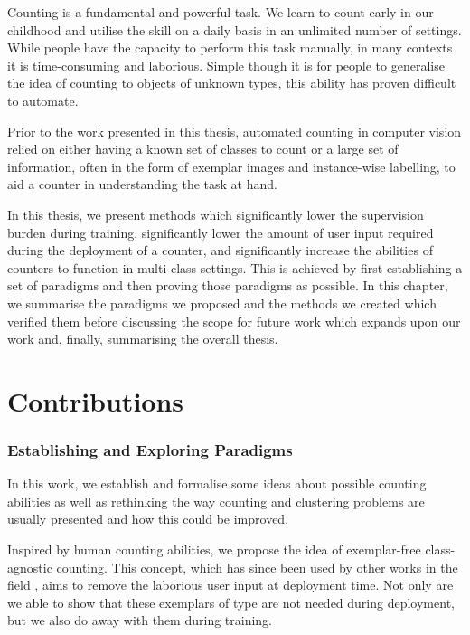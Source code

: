 \documentclass[../thesis.tex]{subfiles}
\begin{document}
Counting is a fundamental and powerful task.
We learn to count early in our childhood and utilise the skill on a daily basis in an unlimited number of settings. 
While people have the capacity to perform this task manually, in many contexts it is time-consuming and laborious.
Simple though it is for people to generalise the idea of counting to objects of unknown types, this ability has proven difficult to automate.

Prior to the work presented in this thesis, automated counting in computer vision relied on either having a known set of classes to count or a large set of information, often in the form of exemplar images and instance-wise labelling, to aid a counter in understanding the task at hand.  

In this thesis, we present methods which significantly lower the  supervision burden during training, significantly lower the amount of user input required during the deployment of a counter, and significantly increase the abilities of counters to function in multi-class settings.
This is achieved by first establishing a set of paradigms and then proving those paradigms as possible.
In this chapter, we summarise the paradigms we proposed and the methods we created which verified them before discussing the scope for future work which expands upon our work and, finally, summarising the overall thesis.




\section{Contributions}\label{conclusion:contributions}

\subsubsection{Establishing and Exploring Paradigms}
In this work, we establish and formalise some ideas about possible counting abilities as well as rethinking the way counting and clustering problems are usually presented and how this could be improved.


Inspired by human counting abilities, we propose the idea of exemplar-free class-agnostic counting. This concept, which has since been used by other works in the field \cite{ranjan2022exemplar, liu2022countr, xu2023zsc}, aims to remove the laborious user input at deployment time. Not only are we able to show that these exemplars of type are not needed during deployment, but we also do away with them during training.
\end{document}
